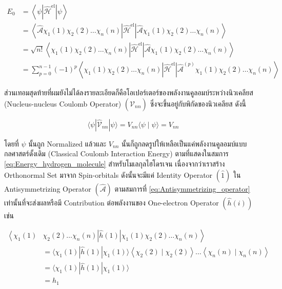 \begin{equation}
    \label{eq:energy_Slater_determinant}
    \begin{aligned}
        E_0
         & = \left\langle\psi
        \left|\hat{\mathscr{H}}^{\mathrm{el}}\right| \psi\right\rangle             \\
         & = \left\langle\hat{\mathscr{A}} \chi_1(1) \chi_2(2) \dots \chi_n(n)
        \left|\hat{\mathscr{H}}^{\mathrm{el}}\right|
        \hat{\mathscr{A}} \chi_1(1) \chi_2(2) \dots \chi_n(n)\right\rangle         \\
         & = \sqrt{n !}\left\langle\chi_1(1) \chi_2(2) \dots \chi_n(n)
        \left|\hat{\mathscr{H}}^{\mathrm{el}}\right|
        \hat{\mathscr{A}} \chi_1(1) \chi_2(2) \dots \chi_n(n)\right\rangle         \\
         & = \sum_{p=0}^{n-1}(-1)^p\left\langle\chi_1(1) \chi_2(2) \dots \chi_n(n)
        \left|\hat{\mathscr{H}}^{\mathrm{el}}\right|
        \hat{\mathscr{A}}^{(p)} \chi_1(1) \chi_2(2) \dots \chi_n(n)\right\rangle
    \end{aligned}
\end{equation}

ส่วนเทอมสุดท้ายที่ผมยังไม่ได้ลงรายละเอียดก็คือโอเปอร์เตอร์ของพลังงานคูลอมบ์ระหว่างนิวเคลียส (Nucleus-nucleus Coulomb Operator)
$(\hat{\mathscr{V}}_{n n})$ ซึ่งจะขึ้นอยู่กับพิกัดของนิวเคลียส ดังนี้

\begin{equation}
    \langle\psi|\hat{\mathscr{V}}_{n n}| \psi\rangle
    = V_{n n}\langle\psi \mid \psi\rangle
    = V_{n n}
\end{equation}

\noindent โดยที่ $\psi$ นั้นถูก Normalized แล้วและ $V_{n n}$ นั้นก็ถูกลดรูปให้เหลือเป็นแค่พลังงานคูลอมบ์แบบกลศาสตร์ดั้งเดิม
(Classical Coulomb Interaction Energy) ตามที่แสดงในสมการ \ref{eq:Energy_hydrogen_molecule} สำหรับโมเลกุลไฮโดรเจน
เนื่องจากว่าเราสร้าง Orthonormal Set มาจาก Spin-orbitals ดังนั้นจะมีแค่ Identity Operator $(\hat{1})$ ใน Antisymmetrizing
Operator $(\hat{\mathscr{A}})$ ตามสมการที่ \ref{eq:Antisymmetrizing_operator} เท่านั้นที่จะส่งผลหรือมี Contribution
ต่อพลังงานของ One-electron Operator $(\hat{h}(i))$ เช่น

\begin{equation}
    \begin{aligned}
        \left\langle \right. \chi_1(1) & \chi_2(2) \dots \chi_n(n)
        |\hat{h}(1)|
        \chi_1(1) \chi_2(2) \dots \chi_n(n) \left. \right\rangle   \\
                                       & = \langle\chi_1(1)
        |\hat{h}(1)|
        \chi_1(1)\rangle\left\langle\chi_2(2) \mid \chi_2(2)\right\rangle
        \dots\left\langle\chi_n(n) \mid \chi_n(n)\right\rangle     \\
                                       & = \langle\chi_1(1)
        |\hat{h}(1)|
        \chi_1(1)\rangle                                           \\
                                       & = h_1
    \end{aligned}
\end{equation}

